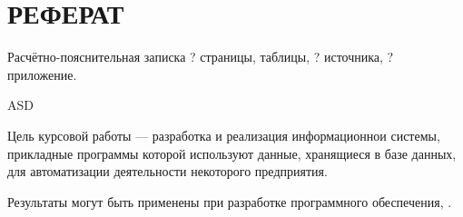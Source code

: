 \chapter*{РЕФЕРАТ}

Расчётно-пояснительная записка ? страницы, \totaltables{} таблицы, ? источника, ? приложение.

ASD

Цель курсовой работы --- разработка и реализация информационнои системы, прикладные программы которой используют данные, хранящиеся в базе данных, для автоматизации деятельности некоторого предприятия.

Результаты могут быть применены при разработке программного обе\-спечения, .
\clearpage